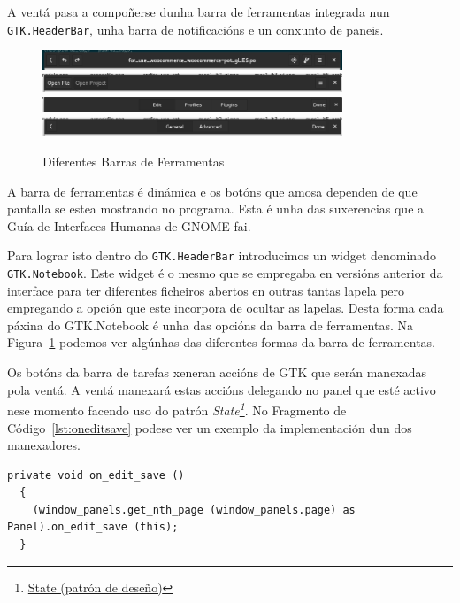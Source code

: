 A ventá pasa a compoñerse dunha barra de ferramentas integrada nun \lstinline{GTK.HeaderBar}, unha barra de notificacións e un conxunto de paneis.

\begin{figure}[h!]
  \centering
    \includegraphics[width=0.8\textwidth]{img/editheaderbar.png}
    \includegraphics[width=0.8\textwidth]{img/openedfilesheaderbar.png}
    \includegraphics[width=0.8\textwidth]{img/preferencesheaderbar.png}
    \includegraphics[width=0.8\textwidth]{img/profileheaderbar.png}
    \caption{Diferentes Barras de Ferramentas}
    \label{fig:ui:v3:headerbar}
\end{figure}

A barra de ferramentas é dinámica e os botóns que amosa dependen de que pantalla se estea mostrando no programa. Esta é unha das suxerencias que a Guía de Interfaces Humanas de GNOME fai.

Para lograr isto dentro do \lstinline{GTK.HeaderBar} introducimos un widget denominado \lstinline{GTK.Notebook}. Este widget é o mesmo que se empregaba en versións anterior da interface para ter diferentes ficheiros abertos en outras tantas lapela pero empregando a opción que este incorpora de ocultar as lapelas. Desta forma cada páxina do GTK.Notebook é unha das opcións da barra de ferramentas. Na Figura~\ref{fig:ui:v3:headerbar} podemos ver algúnhas das diferentes formas da barra de ferramentas.

Os botóns da barra de tarefas xeneran accións de GTK que serán manexadas pola ventá. A ventá manexará estas accións delegando no panel que esté activo nese momento facendo uso do patrón \emph{State\footnote{\href{http://gl.wikipedia.org/wiki/State_\%28patr\%C3\%B3n_de_dese\%C3\%B1o\%29}{State (patrón de deseño)}}}. No Fragmento de Código~\ref{lst:oneditsave} podese ver un exemplo da implementación dun dos manexadores.

\lstset{language=[sharp]C}
\begin{lstlisting}[label=lst:oneditsave,caption=Implemenación do manexador da acción gardar]
  private void on_edit_save ()
  {
    (window_panels.get_nth_page (window_panels.page) as Panel).on_edit_save (this);
  }
\end{lstlisting}

